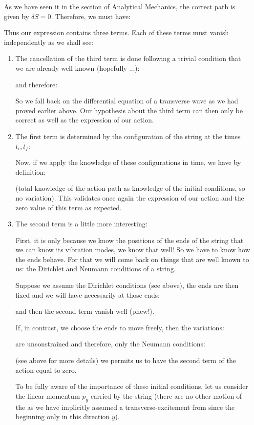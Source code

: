 	As we have seen it in the section of Analytical Mechanics, the correct path is given by $\delta S=0$. Therefore, we must have:
	
	Thus our expression contains three terms. Each of these terms must vanish independently as we shall see:
	\begin{enumerate}
		\item The cancellation of the third term is done following a trivial condition that we are already well known (hopefully ...):
		
		and therefore:
		
		So we fall back on the differential equation of a transverse wave as we had proved earlier above. Our hypothesis about the third term can then only be correct as well as the expression of our action.

		\item The first term is determined by the configuration of the string at the times $t_i,t_f$:
		
		Now, if we apply the knowledge of these configurations in time, we have by definition:
		
		(total knowledge of the action path as knowledge of the initial conditions, so no variation). This validates once again the expression of our action and the zero value of this term as expected.
		
		\item The second term is a little more interesting:
		
		First, it is only because we know the positions of the ends of the string that we can know its vibration modes, we know that well! So we have to know how the ends behave. For that we will come back on things that are well known to us: the Dirichlet and Neumann conditions of a string.
		
		Suppose we assume the Dirichlet conditions (see above), the ends are then fixed and we will have necessarily at those ends:
		
		and then the second term vanish well (phew!).
	
		If, in contrast, we choose the ends to move freely, then the variations:
		
		are unconstrained and therefore, only the Neumann conditions:
		
		(see above for more details) we permits us to have the second term of the action equal to zero.
		
		To be fully aware of the importance of these initial conditions, let us consider the linear momentum $p_y$ carried by the string (there are no other motion of the as we have implicitly assumed a transverse-excitement from since the beginning only in this direction $y$).


\end{enumerate}
